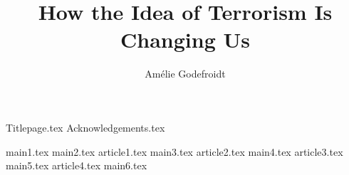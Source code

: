 \documentclass[a4,11pt,multi,twoside,openright]{book}
\title{How the Idea of Terrorism Is Changing Us}
\author{Amélie Godefroidt}
\begin{document}
\frontmatter
{Titlepage.tex}
{Acknowledgements.tex} %

\appto{}
\appto{}
\appto{}
\tableofcontents
\listoftables
\listoffigures
\onehalfspacing %


\mainmatter
{main1.tex} %
{main2.tex} %
{article1.tex} %
{main3.tex} %
{article2.tex} %
{main4.tex} %
{article3.tex} %
{main5.tex} %
{article4.tex} %
{main6.tex} %

\clearpage %
\begin{singlespacing} %
\renewcommand{\bibname}{Bibliography} %


\end{singlespacing}
\backmatter
\end{document}
